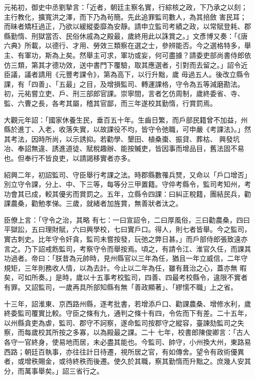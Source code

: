 \begin{pinyinscope}
 元祐初，御史中丞劉摯言：「近者，朝廷主察名實，行綜核之政，下乃承之以刻；主行教化，擴寬洪之澤，而下乃為茍簡。先此追罪監司數人，為其掊斂
 害民耳；而昧者矯枉過正，乃欲以緩縱委靡為安靜。請申立監司考績之政，以常賦登耗、郡縣勤惰、刑獄當否、民俗休戚為之殿最，歲終用此以誅賞之。」文彥博又奏：「《唐六典》所載，以德行、才用、勞效三類察在選之士，參辨能否。今之選格特多，舉主、有軍功，斯為上矣。然舉主可求，軍功或妄，何可盡據？請委吏部尚書侍郎依仿三類，第其才德功效，送中書門下覆驗，取其應選者，引對而去留之。」詔令近臣議，議者請用《元豐考課令》，第為高下，以行升黜，歲
 毋過五人。後改立縣令課，有「四善」、「五最」之目，及增損監司、轉運課格，守令為五等減磨勘法。初，元祐嘗立吏、戶、刑三部郎官課。崇寧間，言者乞仿周制，歲終委省、寺、監、六曹之長，各考其屬，稽其官鄙，而三年遂校其勤惰，行賞罰焉。



 大觀元年詔：「國家休養生民，垂百五十年。生齒日繁，而戶部民籍曾不加益，州縣於進丁、入老，收落失實，以故課役不均，皆守令弛職，可申嚴《考課法》。」然其考法，因時所尚，以示誘抑。若勸學、墾田、植桑棗、振貸、葬枯、
 興發坑冶、奉詔無違、誘進道徒、賦稅趣辦、能按贓吏，皆因事而增品目，舊法固不易也。但奉行不皆良吏，以請謁移實者亦多。



 紹興二年，初詔監司、守臣舉行考課之法。時郡縣數罹兵燹，又命以「戶口增否」別立守令課，分上、中、下三等，每等分三甲置籍。守倅考縣令，監司考知州，考功會其已成，較其優劣而賞罰之。五年，立縣令四課：曰糾正稅籍，團結民兵，勸課農桑，勸勉孝悌。三歲，就緒者加旌賞，無善狀者汰之。



 臣僚上言：「守令之治，其略
 有七：一曰宣詔令，二曰厚風俗，三曰勸農桑，四曰平獄訟，五曰理財賦，六曰興學校，七曰實戶口。得人，則七者皆舉。今之監司，實古刺史。比年守令奸貪，監司未嘗按發，玩弛之弊日甚。」而戶部侍郎張致遠亦言之。乃下詔戒飭監司，考察守令而舉按焉。頃之，有請令江、淮官久任，而課其功過者。帝曰：「朕昔為元帥時，見州縣官以三年為任，猶且一年立威信，二年守規矩，三年則務收人情，以為去計。今止以二年為任，雖有葺治之心，蓋亦無
 暇矣，可如所奏。」是時，歲以十五事考校監司，四善、四最考校縣令，違限不實者有罪。又詔監司，一歲再具所部知縣有無「善政顯著」、「繆懦不職」上之省。



 十三年，詔淮東、京西路州縣，逐考批書，若增添戶口、勸課農桑、增修水利，歲終委監司覆實比較。守臣之條有九，通判之條十有四，令佐而下有差。二十五年，以州縣貪吏為虐，監司、郡守不訶察，遂命監司按郡守之縱容，臺諫劾監司之失察，而每歲校其所按之多寡，以為殿最之課。二十
 七年，校書郎陳俊卿言：「古人各守一官終身，使易地而居，未必盡其能也。今監司、帥守，小州換大州，東路易西路；朝廷百執事，亦往往計日待遷，視所居之官，有如傳舍。望令有政術優異者，或增秩賜金，或待終秩而後遷。使久於其職，察其勤惰而升黜之。庶幾人安其分，而萬事舉矣。」詔三省行之。




\end{pinyinscope}
